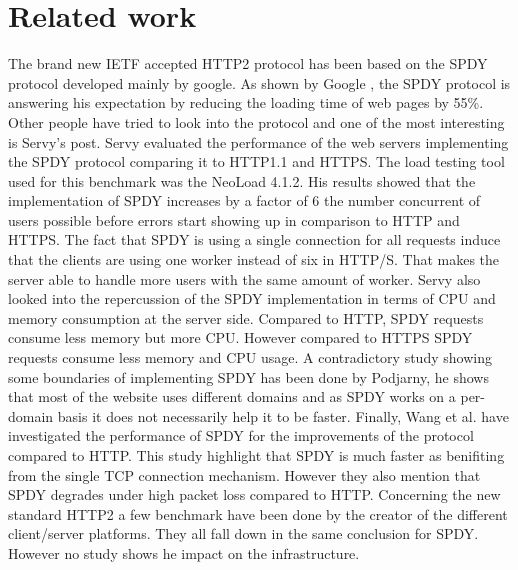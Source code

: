\section{Related work}
\label{relwork}
The brand new IETF accepted HTTP2 protocol has been based on the SPDY protocol developed mainly by google. As shown by Google \cite{Google2x}, the SPDY protocol is answering his expectation by reducing the loading time of web pages by 55\%. Other people have tried to look into the protocol and one of the most interesting is Servy's post. Servy evaluated the performance of the web servers implementing the SPDY protocol comparing it to HTTP1.1 and HTTPS. The load testing tool used for this benchmark was the NeoLoad 4.1.2. His results showed that the implementation of SPDY increases by a factor of 6 the number concurrent of users possible before errors start showing up in comparison to HTTP and HTTPS. The fact that SPDY is using a single connection for all requests induce that the clients are using one worker instead of six in HTTP/S. That makes the server able to handle more users with the same amount of worker. Servy also looked into the repercussion of the SPDY implementation in terms of CPU and memory consumption at the server side. Compared to HTTP, SPDY requests consume less memory but more CPU. However compared to HTTPS SPDY requests consume less memory and CPU usage.
A contradictory study showing some boundaries of implementing SPDY has been done by Podjarny\cite{podiatry}, he shows that most of the website uses different domains and as SPDY works on a per-domain basis it does not necessarily help it to be faster. Finally, Wang et al. have investigated the performance of SPDY for the improvements of the protocol compared to HTTP. This study highlight that SPDY is much faster as benifiting from the single TCP connection mechanism. However they also mention that SPDY degrades under high packet loss compared to HTTP. 
Concerning the new standard HTTP2 a few benchmark have been done by the creator of the different client/server platforms. They all fall down in the same conclusion for SPDY. However no study shows he impact on the infrastructure.